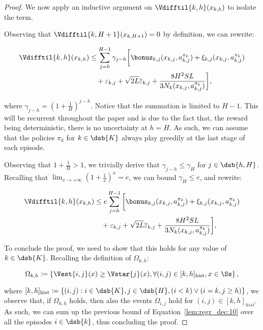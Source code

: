\begin{proof}
We now apply an inductive argument on $\Vdifftil{k,h}(x_{k,h})$ to isolate the term.

Observing that $\Vdifftil{k,H+1}(x_{k,H+1}) = 0$ by definition, we can rewrite:

\begin{align*}
    \Vdifftil{k,h}(x_{k,h}) &\le \sum_{j=h}^{H-1} \gamma_{j-h} \bigg[ \bonus_{k,j}(x_{k,j}, a_{k,j}^{\pi_k}) + 
    \xi_{k,j} (x_{k,j}, a_{k,j}^{\pi_k}) \\
    &\quad + \varepsilon_{k,j} + \sqrt{2L} \overline{\varepsilon}_{k,j} + \frac{8H^2SL}{3N_k(x_{k,j},a_{k,j}^{\pi_k})} \bigg],
\end{align*}

where $\gamma_{j-h} = \left(1+\frac{1}{H}\right)^{j-h}$. Notice that the summation is limited to $H-1$. This will be recurrent throughout the paper and is due to the fact that, the reward being deterministic, there is no uncertainty at $h=H$.
As such, we can assume that the policies $\pi_k$ for $k \in \dsb{K}$ always play greedily at the last stage of each episode.

Observing that $1 + \frac{1}{H} > 1$, we trivially derive that $\gamma_{j-h} \le \gamma_H$ for $j \in \dsb{h,H}$. Recalling that $\lim_{x \to +\infty} \left(1 + \frac{1}{x}\right)^x = e$, we can bound $\gamma_H \le e$, and rewrite:

\begin{align}
    \begin{split}\label{lem:regr_dec:10}
    \Vdifftil{k,h}(x_{k,h}) &\le e \sum_{j=h}^{H-1} \bigg[ \bonus_{k,j}(x_{k,j}, a_{k,j}^{\pi_k}) +
    \xi_{k,j} (x_{k,j}, a_{k,j}^{\pi_k}) \\
    &\quad + \varepsilon_{k,j} + \sqrt{2L} \overline{\varepsilon}_{k,j} + \frac{8H^2SL}{3N_k(x_{k,j},a_{k,j}^{\pi_k})} \bigg],
    \end{split}
\end{align}

To conclude the proof, we need to show that this holds for any value of $k \in \dsb{K}$. Recalling the definition of $\Omega_{k,h}$:

\begin{equation*}
    \Omega_{k,h} \coloneqq \left\{ \Vest{i,j}(x) \ge \Vstar{j}(x), \forall (i,j) \in [k,h]_{\mathrm{hist}}, x \in \Ss \right\},
\end{equation*}

where $[k,h]_{\mathrm{hist}} \coloneqq \left\{ (i,j) : i \in \dsb{K}, j \in \dsb{H}, (i<k) \vee (i=k, j \ge h) \right\}$, we observe that, if $\Omega_{k,h}$ holds, then also the events $\Omega_{i,j}$ hold for $(i,j)\in[k,h]_{hist}$. As such, we can sum up the previous bound of Equation~\eqref{lem:regr_dec:10} over all the episodes $i \in \dsb{k}$, thus concluding the proof.
\end{proof}

